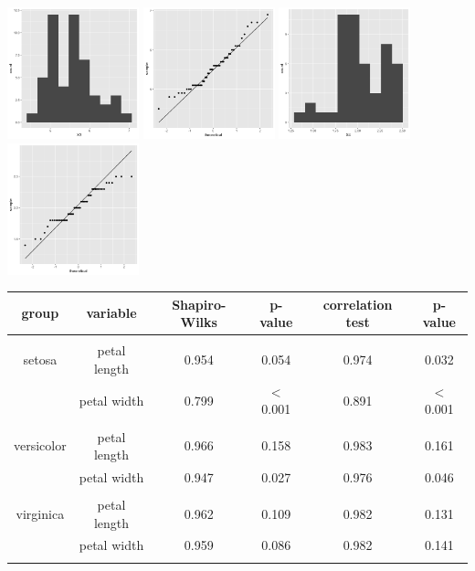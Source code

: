 \begin{center}
	\includegraphics[width=1.5in]{II_3_X3_hist.png}
	\includegraphics[width=1.5in]{II_3_X3_qq.png}
	\includegraphics[width=1.5in]{II_3_X4_hist.png}
	\includegraphics[width=1.5in]{II_3_X4_qq.png}
\end{center}

\begin{center}
\begin{tabular}{| c c | c c | c c |}
	\hline
	group & variable & Shapiro-Wilks & p-value & correlation test & p-value \\
	\hline
	&&&&&\\
	setosa & petal length & 0.954 & 0.054 & 0.974 & 0.032 \\
	& petal width & 0.799 & $<$0.001 & 0.891 & $<$0.001\\
	&&&&&\\
	versicolor & petal length & 0.966 & 0.158 & 0.983 & 0.161\\
	& petal width & 0.947 & 0.027 & 0.976 & 0.046 \\
	&&&&&\\
	virginica & petal length & 0.962 & 0.109 & 0.982 & 0.131 \\
	& petal width & 0.959 & 0.086 & 0.982 & 0.141 \\
	&&&&&\\
\hline
\end{tabular}
\end{center}

